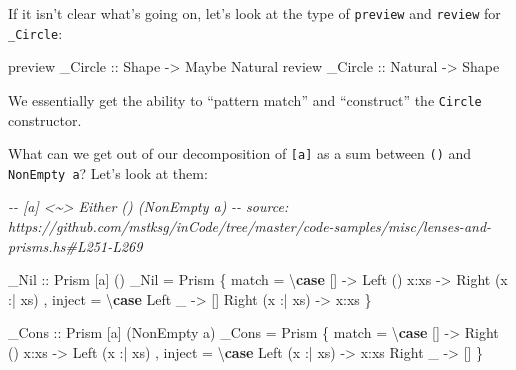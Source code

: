 \documentclass[]{article}
\newenvironment{Shaded}{}{}
\newcommand{\CommentTok}[1]{\textcolor[rgb]{0.38,0.63,0.69}{\textit{#1}}}
\newcommand{\DataTypeTok}[1]{\textcolor[rgb]{0.56,0.13,0.00}{#1}}
\newcommand{\KeywordTok}[1]{\textcolor[rgb]{0.00,0.44,0.13}{\textbf{#1}}}
\newcommand{\NormalTok}[1]{#1}
\newcommand{\OperatorTok}[1]{\textcolor[rgb]{0.40,0.40,0.40}{#1}}
\newcommand{\OtherTok}[1]{\textcolor[rgb]{0.00,0.44,0.13}{#1}}
\begin{document}
If it isn't clear what's going on, let's look at the type of \texttt{preview}
and \texttt{review} for \texttt{\_Circle}:

\begin{Shaded}
\begin{Highlighting}[]
\NormalTok{preview}\OtherTok{ \_Circle ::} \DataTypeTok{Shape}   \OtherTok{{-}\textgreater{}} \DataTypeTok{Maybe} \DataTypeTok{Natural}
\NormalTok{review}\OtherTok{  \_Circle ::} \DataTypeTok{Natural} \OtherTok{{-}\textgreater{}} \DataTypeTok{Shape}
\end{Highlighting}
\end{Shaded}

We essentially get the ability to ``pattern match'' and ``construct'' the
\texttt{Circle} constructor.

What can we get out of our decomposition of \texttt{{[}a{]}} as a sum between
\texttt{()} and \texttt{NonEmpty\ a}? Let's look at them:

\begin{Shaded}
\begin{Highlighting}[]
\CommentTok{{-}{-} [a] \textless{}\textasciitilde{}\textgreater{} Either () (NonEmpty a)}
\CommentTok{{-}{-} source: https://github.com/mstksg/inCode/tree/master/code{-}samples/misc/lenses{-}and{-}prisms.hs\#L251{-}L269}

\OtherTok{\_Nil ::} \DataTypeTok{Prism\textquotesingle{}}\NormalTok{ [a] ()}
\NormalTok{\_Nil }\OtherTok{=} \DataTypeTok{Prism\textquotesingle{}}
\NormalTok{    \{ match  }\OtherTok{=}\NormalTok{ \textbackslash{}}\KeywordTok{case}
\NormalTok{        []              }\OtherTok{{-}\textgreater{}} \DataTypeTok{Left}\NormalTok{ ()}
\NormalTok{        x}\OperatorTok{:}\NormalTok{xs            }\OtherTok{{-}\textgreater{}} \DataTypeTok{Right}\NormalTok{ (x }\OperatorTok{:|}\NormalTok{ xs)}
\NormalTok{    , inject }\OtherTok{=}\NormalTok{ \textbackslash{}}\KeywordTok{case}
        \DataTypeTok{Left}\NormalTok{ \_          }\OtherTok{{-}\textgreater{}}\NormalTok{ []}
        \DataTypeTok{Right}\NormalTok{ (x }\OperatorTok{:|}\NormalTok{ xs) }\OtherTok{{-}\textgreater{}}\NormalTok{ x}\OperatorTok{:}\NormalTok{xs}
\NormalTok{    \}}

\OtherTok{\_Cons ::} \DataTypeTok{Prism\textquotesingle{}}\NormalTok{ [a] (}\DataTypeTok{NonEmpty}\NormalTok{ a)}
\NormalTok{\_Cons }\OtherTok{=} \DataTypeTok{Prism\textquotesingle{}}
\NormalTok{    \{ match  }\OtherTok{=}\NormalTok{ \textbackslash{}}\KeywordTok{case}
\NormalTok{        []              }\OtherTok{{-}\textgreater{}} \DataTypeTok{Right}\NormalTok{ ()}
\NormalTok{        x}\OperatorTok{:}\NormalTok{xs            }\OtherTok{{-}\textgreater{}} \DataTypeTok{Left}\NormalTok{ (x }\OperatorTok{:|}\NormalTok{ xs)}
\NormalTok{    , inject }\OtherTok{=}\NormalTok{ \textbackslash{}}\KeywordTok{case}
        \DataTypeTok{Left}\NormalTok{  (x }\OperatorTok{:|}\NormalTok{ xs) }\OtherTok{{-}\textgreater{}}\NormalTok{ x}\OperatorTok{:}\NormalTok{xs}
        \DataTypeTok{Right}\NormalTok{ \_         }\OtherTok{{-}\textgreater{}}\NormalTok{ []}
\NormalTok{    \}}
\end{Highlighting}
\end{Shaded}
\end{document}
